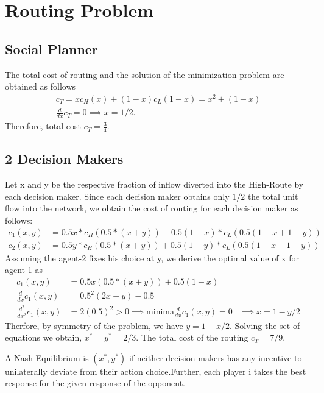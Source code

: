 \documentclass[11pt]{article}
\theoremstyle{definition}
\begin{document}
\section{Routing Problem}

\subsection{Social Planner}
The total cost of routing and the solution of the minimization problem are obtained as follows
\begin{align*}
c_T = x c_H(x) + (1-x) c_L(1-x) = x^2 + (1-x)\\
\frac{d}{dx}c_T = 0 \implies x = 1/2.
\end{align*}
Therefore, total cost $c_T = \frac{3}{4}$.

\subsection{2 Decision Makers}

Let x and y be the respective fraction of inflow diverted into the High-Route by each decision maker. 
Since each decision maker obtains only $1/2$ the total unit flow into the network, we obtain the cost of routing for each decision maker as follows:
\begin{align*}
c_1(x,y) &= 0.5x * c_H(0.5*(x+y)) + 0.5(1-x) * c_L(0.5(1-x + 1-y))\\
c_2(x,y) &= 0.5y * c_H(0.5*(x+y)) + 0.5(1-y) * c_L(0.5(1-x + 1-y))
\end{align*}
Assuming the agent-2 fixes his choice at y, we derive the optimal value of x for agent-1 as 
\begin{align*}
c_1(x,y) &= 0.5x(0.5*(x+y))+ 0.5(1-x)\\
\frac{d}{dx}c_1(x,y) &= 0.5^2(2x + y) - 0.5\\ 
\frac{d^2}{dx^2}c_1(x,y) &= 2(0.5)^2 > 0 \implies \text{minima}
\frac{d}{dx}c_1(x,y) = 0 &\implies x = 1-y/2
\end{align*}
Therfore, by symmetry of the problem, we have $y = 1-x/2$.
Solving the set of equations we obtain, $x^* = y^* = 2/3$. The total cost of the routing $c_T = 7/9$.

A Nash-Equilibrium is $(x^*,y^*)$ if neither decision makers has any incentive to unilaterally deviate from their action choice.Further, each player i takes the best response for the given response of the opponent. 
\end{document}
